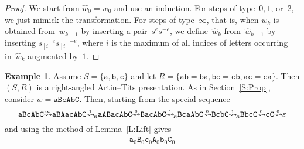 \documentclass{amsart}
\numberwithin{equation}{section}
\theoremstyle{plain}
\theoremstyle{definition}
\newtheorem{exam}[prop]{Example}
\begin{document}
\begin{proof}
We start from ${\widehat{w}}_0 = {w}_0$ and use an induction. For steps of type~$0, 1$, or~$2$, we just mimick the transformation. For steps of type~$\infty$, that is, when ${w}_{k}$ is obtained from~${w}_{{k}-1}$ by inserting a pair~${s}^{e} {s}^{-{e}}$, we define~${\widehat{w}}_{k}$ from~${\widehat{w}}_{{k}-1}$ by inserting ${{s}_{[{i}]}}^{e} {{s}_{[{i}]}}^{-{e}}$, where ${i}$ is the maximum of all indices of letters occurring in~${\widehat{w}}_{k}$ augmented by~$1$.
\end{proof}

\begin{exam}
\label{X:Abelian2}
Assume ${S} = \{{\mathtt{a}}, {\mathtt{b}}, {\mathtt{c}}\}$ and let ${R} = \{{\mathtt{a}} {\mathtt{b}} = {\mathtt{b}} {\mathtt{a}}, {\mathtt{b}} {\mathtt{c}} = {\mathtt{c}} {\mathtt{b}}, {\mathtt{a}} {\mathtt{c}} = {\mathtt{c}} {\mathtt{a}}\}$. Then $({S}, {R})$ is a right-angled Artin--Tits presentation. As in Section~\ref{S:Prop}, consider ${w} = {\mathtt{a}} {\mathtt{B}} {\mathtt{c}} {\mathtt{A}} {\mathtt{b}} {\mathtt{C}}$. Then, starting from the special sequence
\begin{equation*}
{\mathtt{a}} {\mathtt{B}} {\mathtt{c}} {\mathtt{A}} {\mathtt{b}} {\mathtt{C}}
{\overset{{}_{\infty}}{\rightsquigarrow}} {\mathtt{a}} {\mathtt{B}} {\mathtt{A}} {\mathtt{a}} {\mathtt{c}} {\mathtt{A}} {\mathtt{b}} {\mathtt{C}}
{\overset{{}_{1}}{\rightsquigarrow}_{\hspace{-0.4ex}{\scriptscriptstyle R}}} {\mathtt{a}} {\mathtt{A}} {\mathtt{B}} {\mathtt{a}} {\mathtt{c}} {\mathtt{A}} {\mathtt{b}} {\mathtt{C}}
{\overset{{}_{0}}{\rightsquigarrow}} {\mathtt{B}} {\mathtt{a}} {\mathtt{c}} {\mathtt{A}} {\mathtt{b}} {\mathtt{C}}
{\overset{{}_{1}}{\rightsquigarrow}_{\hspace{-0.4ex}{\scriptscriptstyle R}}} {\mathtt{B}} {\mathtt{c}} {\mathtt{a}} {\mathtt{A}} {\mathtt{b}} {\mathtt{C}}
{\overset{{}_{0}}{\rightsquigarrow}} {\mathtt{B}} {\mathtt{c}} {\mathtt{b}} {\mathtt{C}}
{\overset{{}_{1}}{\rightsquigarrow}_{\hspace{-0.4ex}{\scriptscriptstyle R}}} {\mathtt{B}} {\mathtt{b}} {\mathtt{c}} {\mathtt{C}}
{\overset{{}_{0}}{\rightsquigarrow}} {\mathtt{c}} {\mathtt{C}}
{\overset{{}_{0}}{\rightsquigarrow}} {\varepsilon}
\end{equation*}
and using the method of Lemma~\ref{L:Lift} gives
\begin{multline*}
{{\mathtt{a}}_{0}} {{\mathtt{B}}_{0}} {{\mathtt{c}}_{0}} {{\mathtt{A}}_{0}} {{\mathtt{b}}_{0}} {{\mathtt{C}}_{0}}

\end{multline*}
\end{exam}
\end{document}
